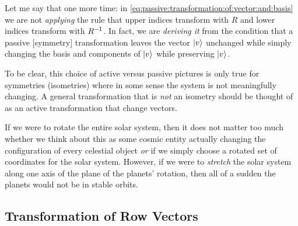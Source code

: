 \documentclass[12pt, oneside]{report}    %
\begin{document}
Let me say that one more time: in \eqref{eq:passive:transformation:of:vector:and:basis} we are not \emph{applying} the rule that upper indices transform with $R$ and lower indices transform with $R^{-1}$. In fact, we are \emph{deriving it} from the condition that a passive [symmetry] transformation leaves the vector $\left|v\right\rangle$ unchanged while simply changing the basis and components of $\left|v\right\rangle$ while preserving $\left|v\right\rangle$.



To be clear, this choice of active versus passive pictures is only true for symmetries (isometries) where in some sense the system is not meaningfully changing. A general transformation that is \emph{not} an isometry should be thought of as an active transformation that change vectors.
\begin{example}
If we were to rotate the entire solar system, then it does not matter too much whether we think about this as some cosmic entity actually changing the configuration of every celestial object \emph{or} if we simply choose a rotated set of coordinates for the solar system. However, if we were to \emph{stretch} the solar system along one axis of the plane of the planets' rotation, then all of a sudden the planets would not be in stable orbits.\sidenotemark
\end{example}


\subsection{Transformation of Row Vectors}
\end{document}
